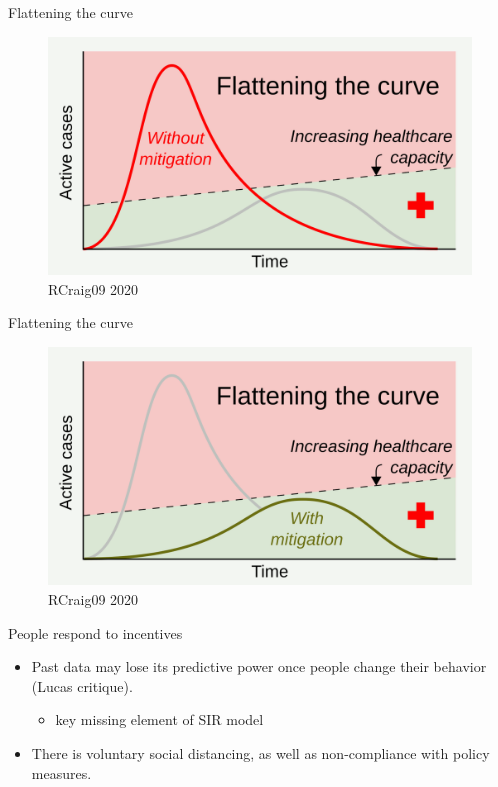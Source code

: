\documentclass[ignorenonframetext,aspectratio=54,]{beamer}
\providecommand{\tightlist}{%
  \setlength{\itemsep}{0pt}\setlength{\parskip}{0pt}}
\begin{document}
\begin{frame}{Flattening the curve}
\protect\hypertarget{flattening-the-curve}{}

\begin{figure}
\centering
\includegraphics{exhibit/fig/flatten1.png}
\caption{RCraig09 2020}
\end{figure}

\end{frame}

\begin{frame}{Flattening the curve}
\protect\hypertarget{flattening-the-curve-1}{}

\begin{figure}
\centering
\includegraphics{exhibit/fig/flatten2.png}
\caption{RCraig09 2020}
\end{figure}

\end{frame}

\begin{frame}{People respond to incentives}
\protect\hypertarget{people-respond-to-incentives}{}

\begin{itemize}
\tightlist
\item
  Past data may lose its predictive power once people change their
  behavior (Lucas critique).

  \begin{itemize}
  \tightlist
  \item
    key missing element of SIR model
  \end{itemize}
\item
  There is voluntary social distancing, as well as non-compliance with
  policy measures.
\end{itemize}

\end{frame}
\end{document}
